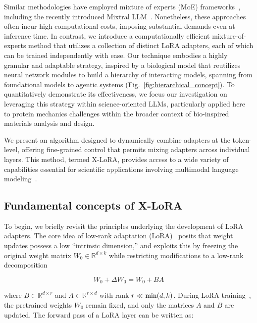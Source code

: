 Similar methodologies have employed mixture of experts (MoE) frameworks~\cite{Jacobs1991AdaptiveExperts,Hampshire1992TheRecognition,Jordan1994HierarchicalAlgorithm}, including the recently introduced Mixtral LLM~\cite{Jiang2024MixtralExperts}. Nonetheless, these approaches often incur high computational costs, imposing substantial demands even at inference time. In contrast, we introduce a computationally efficient mixture-of-experts method that utilizes a collection of distinct LoRA adapters, each of which can be trained independently with ease. Our technique embodies a highly granular and adaptable strategy, inspired by a biological model that reutilizes neural network modules to build a hierarchy of interacting models, spanning from foundational models to agentic systems (Fig.~\ref{fig:hierarchical_concept}). To quantitatively demonstrate its effectiveness, we focus our investigation on leveraging this strategy within science-oriented LLMs, particularly applied here to protein mechanics challenges within the broader context of bio-inspired materials analysis and design.

We present an algorithm designed to dynamically combine adapters at the token-level, offering fine-grained control that permits mixing adapters across individual layers. This method, termed X-LoRA, provides access to a wide variety of capabilities essential for scientific applications involving multimodal language modeling~\cite{Hu2023DeepScience,Buehler2023AMetamaterials,Buehler2022ProteinNetworks}.

\subsection{Fundamental concepts of X-LoRA}

To begin, we briefly revisit the principles underlying the development of LoRA adapters. The core idea of low-rank adaptation (LoRA)~\cite{hu2021lora} posits that weight updates possess a low “intrinsic dimension,” and exploits this by freezing the original weight matrix $W_0 \in \mathbb{R}^{d \times k}$ while restricting modifications to a low-rank decomposition

\begin{equation}
W_0 + \Delta W_0 = W_0 + BA 
\end{equation}

where $B \in \mathbb{R}^{d \times r}$ and $A \in \mathbb{R}^{r \times d}$ with rank $r \ll {\rm min}(d,k)$. During LoRA training~\cite{hu2021lora}, the pretrained weights $W_0$ remain fixed, and only the matrices $A$ and $B$ are updated. The forward pass of a LoRA layer can be written as:

